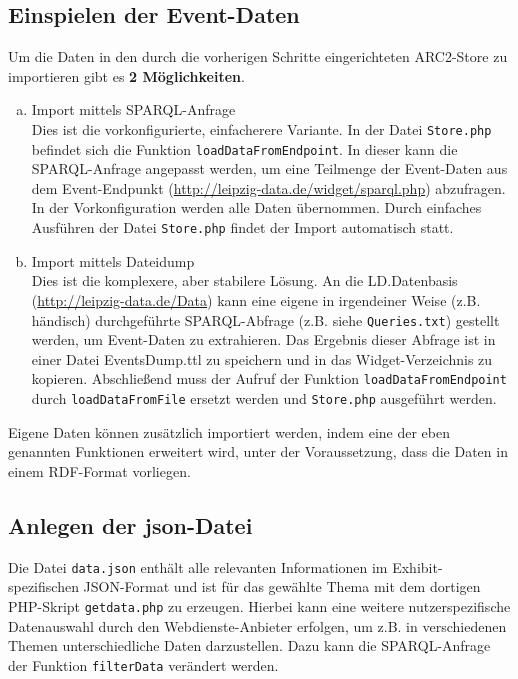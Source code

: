 \documentclass[11pt,a4paper]{article}
\begin{document}
\subsection{Einspielen der Event-Daten}
Um die Daten in den durch die vorherigen Schritte eingerichteten ARC2-Store zu importieren gibt es \textbf{2 Möglichkeiten}.
\begin{enumerate}[(a)]
	\item Import mittels SPARQL-Anfrage\\
	Dies ist die vorkonfigurierte, einfacherere Variante. In der Datei \texttt{Store.php} befindet sich die Funktion \texttt{loadDataFromEndpoint}. In dieser kann die SPARQL-Anfrage angepasst werden, um eine Teilmenge der Event-Daten aus dem Event-Endpunkt (\url{http://leipzig-data.de/widget/sparql.php}) abzufragen. In der Vorkonfiguration werden alle Daten übernommen. Durch einfaches Ausführen der Datei \texttt{Store.php} findet der Import automatisch statt.
	\item Import mittels Dateidump\\
Dies ist die komplexere, aber stabilere Lösung.
An die LD.Datenbasis (\url{http://leipzig-data.de/Data}) kann eine eigene in irgendeiner Weise (z.B. händisch) durchgeführte SPARQL-Abfrage (z.B. siehe \texttt{Queries.txt}) gestellt werden, um Event-Daten zu extrahieren.
Das Ergebnis dieser Abfrage ist in einer Datei EventsDump.ttl zu speichern und in das Widget-Verzeichnis zu kopieren. Abschließend muss der Aufruf der Funktion \texttt{loadDataFromEndpoint} durch \texttt{loadDataFromFile} ersetzt werden und \texttt{Store.php} ausgeführt werden.
\end{enumerate}


Eigene Daten können zusätzlich importiert werden, indem eine der eben genannten Funktionen erweitert wird, unter der Voraussetzung, dass die  Daten in einem RDF-Format vorliegen. 

\subsection{Anlegen der json-Datei}

Die Datei \texttt{data.json} enthält alle relevanten Informationen im
Exhibit-spezifischen JSON-Format und ist für das gewählte Thema mit dem
dortigen PHP-Skript \texttt{getdata.php} zu erzeugen.  Hierbei kann eine
weitere nutzerspezifische Datenauswahl durch den Webdienste-Anbieter erfolgen, um z.B. in verschiedenen Themen unterschiedliche Daten darzustellen. Dazu kann die SPARQL-Anfrage der Funktion \texttt{filterData} verändert werden.
\end{document}
